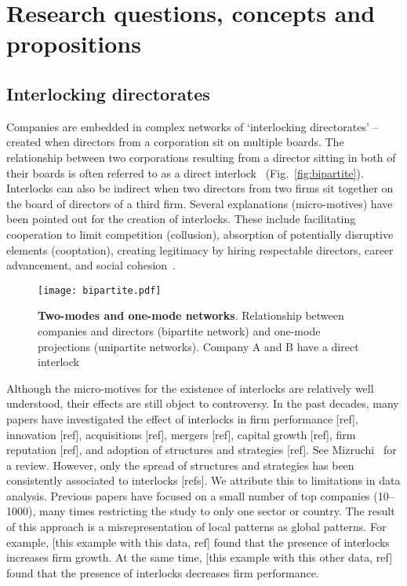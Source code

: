 \section{Research questions, concepts and propositions}
\label{sec:question}
\subsection{Interlocking directorates}
Companies are embedded in complex networks of `interlocking directorates' -- 
created when directors from a corporation sit on multiple boards.
The relationship between two corporations resulting from a director sitting in both of their boards is often referred to as a direct interlock~\citep{Mizruchi1996} (Fig.~\ref{fig:bipartite}).
Interlocks can also be indirect when two directors from two firms sit together on the board of directors of a third firm. 
Several explanations (micro-motives) have been pointed out for the creation of interlocks. 
These include facilitating cooperation to limit competition (collusion),  
absorption of potentially disruptive elements (cooptation), 
creating legitimacy by hiring respectable directors, 
career advancement, and social cohesion~\citep{Mizruchi1996}.

\begin{figure}
\begin{center}
\texttt{[image: bipartite.pdf]}
\caption{\textbf{Two-modes and one-mode networks}. Relationship between companies and directors (bipartite network) and one-mode projections (unipartite networks). Company A and B have a direct interlock}
\label{fig:entropy}
\end{center}
\end{figure}

Although the micro-motives for the existence of interlocks are relatively well understood, 
their effects are still object to controversy. 
In the past decades, many papers have investigated the effect of interlocks in firm performance [ref], innovation [ref], acquisitions [ref], mergers [ref], capital growth [ref], firm reputation [ref], and adoption of structures and strategies [ref]. See Mizruchi~\cite{Mizruchi1996} for a review.
However, only the spread of structures and strategies has been consistently associated to interlocks [refs].
We attribute this to limitations in data analysis.
Previous papers have focused on a small number of top companies (10--1000), 
many times restricting the study to only one sector or country. 
The result of this approach is a misrepresentation of local patterns as global patterns.
For example, 
[this example with this data, ref] found that the presence of interlocks increases firm growth.
At the same time,
[this example with this other data, ref] found that the presence of interlocks decreases firm performance.


